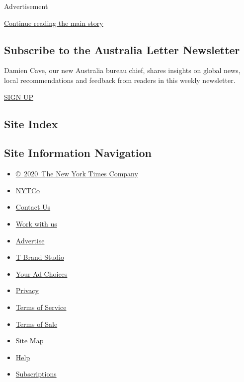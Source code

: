 Advertisement

\protect\hyperlink{after-mktg}{Continue reading the main story}

\hypertarget{subscribe-to-the-australia-letter-newsletter}{%
\subsection{Subscribe to the Australia Letter
Newsletter}\label{subscribe-to-the-australia-letter-newsletter}}

Damien Cave, our new Australia bureau chief, shares insights on global
news, local recommendations and feedback from readers in this weekly
newsletter.

\href{/newsletters/signup/AUST}{SIGN UP}

\hypertarget{site-index}{%
\subsection{Site Index}\label{site-index}}

\hypertarget{site-information-navigation}{%
\subsection{Site Information
Navigation}\label{site-information-navigation}}

\begin{itemize}
\tightlist
\item
  \href{https://help.nytimes3xbfgragh.onion/hc/en-us/articles/115014792127-Copyright-notice}{©~2020~The
  New York Times Company}
\end{itemize}

\begin{itemize}
\tightlist
\item
  \href{https://www.nytco.com/}{NYTCo}
\item
  \href{https://help.nytimes3xbfgragh.onion/hc/en-us/articles/115015385887-Contact-Us}{Contact
  Us}
\item
  \href{https://www.nytco.com/careers/}{Work with us}
\item
  \href{https://nytmediakit.com/}{Advertise}
\item
  \href{http://www.tbrandstudio.com/}{T Brand Studio}
\item
  \href{https://www.nytimes3xbfgragh.onion/privacy/cookie-policy\#how-do-i-manage-trackers}{Your
  Ad Choices}
\item
  \href{https://www.nytimes3xbfgragh.onion/privacy}{Privacy}
\item
  \href{https://help.nytimes3xbfgragh.onion/hc/en-us/articles/115014893428-Terms-of-service}{Terms
  of Service}
\item
  \href{https://help.nytimes3xbfgragh.onion/hc/en-us/articles/115014893968-Terms-of-sale}{Terms
  of Sale}
\item
  \href{https://spiderbites.nytimes3xbfgragh.onion}{Site Map}
\item
  \href{https://help.nytimes3xbfgragh.onion/hc/en-us}{Help}
\item
  \href{https://www.nytimes3xbfgragh.onion/subscription?campaignId=37WXW}{Subscriptions}
\end{itemize}
